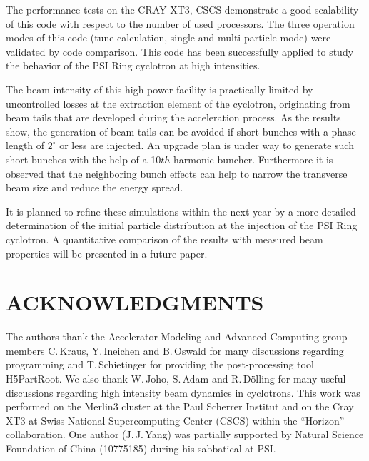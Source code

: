 \documentclass[aps,prstab,twocolumn,superscriptaddress,showpacs]{revtex4}
\begin{document}
The performance tests on the CRAY XT3, CSCS demonstrate a good scalability of this code with respect to the number of used processors. 
The three operation modes of this code (tune calculation, single and multi particle mode) were validated by code comparison. This code has been successfully applied to study the behavior of the PSI Ring cyclotron at high intensities.

The beam intensity of this high power facility is practically limited by uncontrolled losses at the extraction element of the cyclotron, originating from beam tails that are developed during the acceleration process.
As the results show, the generation of beam tails can be avoided if short bunches with a phase length of $2^\circ$  or less are injected. 
An upgrade plan is under way to generate such short bunches with the help of a 10$th$ harmonic buncher.
Furthermore it is observed that the neighboring bunch effects can help to narrow the transverse beam size and reduce the energy spread.

It is planned to refine these simulations within the next year by a more detailed determination of the initial particle distribution at the injection
of the PSI Ring cyclotron. A quantitative comparison of the results with measured beam properties will be presented in a future paper.
\section{ACKNOWLEDGMENTS}
The authors thank the Accelerator Modeling and Advanced Computing group members C.\,Kraus, Y.\,Ineichen and B.\,Oswald for many 
discussions regarding programming and T.\,Schietinger for providing the post-processing tool
H5PartRoot. We also thank W.\,Joho, S.\,Adam and R.\,D\"olling for many useful discussions regarding high
intensity beam dynamics in cyclotrons. This work was performed on the Merlin3 cluster at the Paul Scherrer Institut 
and on the Cray XT3 at Swiss National Supercomputing Center (CSCS) within the ``Horizon'' collaboration. One author (J.\,J.\,Yang) 
was partially supported by Natural Science Foundation of China (10775185) during his sabbatical at PSI.

\end{document}
